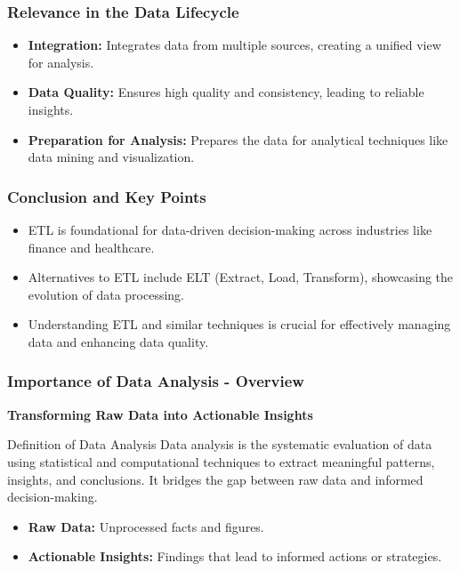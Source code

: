 \documentclass[aspectratio=169]{beamer}
\begin{document}
\begin{frame}
  \frametitle{Relevance in the Data Lifecycle}
  \begin{itemize}
    \item \textbf{Integration:} Integrates data from multiple sources, creating a unified view for analysis.
    \item \textbf{Data Quality:} Ensures high quality and consistency, leading to reliable insights.
    \item \textbf{Preparation for Analysis:} Prepares the data for analytical techniques like data mining and visualization.
  \end{itemize}
\end{frame}

\begin{frame}
  \frametitle{Conclusion and Key Points}
  \begin{itemize}
    \item ETL is foundational for data-driven decision-making across industries like finance and healthcare.
    \item Alternatives to ETL include ELT (Extract, Load, Transform), showcasing the evolution of data processing.
    \item Understanding ETL and similar techniques is crucial for effectively managing data and enhancing data quality.
  \end{itemize}
\end{frame}

\begin{frame}[fragile]
    \frametitle{Importance of Data Analysis - Overview}
    \textbf{Transforming Raw Data into Actionable Insights}
    
    \begin{block}{Definition of Data Analysis}
        Data analysis is the systematic evaluation of data using statistical and computational techniques to extract meaningful patterns, insights, and conclusions. It bridges the gap between raw data and informed decision-making.
    \end{block}
    
    \begin{itemize}
        \item \textbf{Raw Data:} Unprocessed facts and figures.
        \item \textbf{Actionable Insights:} Findings that lead to informed actions or strategies.
    \end{itemize}
\end{frame}
\end{document}
